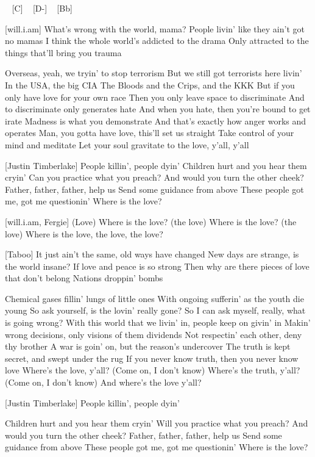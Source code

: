 \begin{guitar}
[F] ~ [C] ~ [D-] ~ [Bb]

[will.i.am]
What's wrong with the world, mama?
People livin' like they ain't got no mamas
I think the whole world's addicted to the drama
Only attracted to the things that'll bring you trauma

Overseas, yeah, we tryin' to stop terrorism
But we still got terrorists here livin'
In the USA, the big CIA
The Bloods and the Crips, and the KKK
But if you only have love for your own race
Then you only leave space to discriminate
And to discriminate only generates hate
And when you hate, then you're bound to get irate
Madness is what you demonstrate
And that's exactly how anger works and operates
Man, you gotta have love, this'll set us straight
Take control of your mind and meditate
Let your soul gravitate to the love, y'all, y'all

[Justin Timberlake]
People killin', people dyin'
Children hurt and you hear them cryin'
Can you practice what you preach?
And would you turn the other cheek?
Father, father, father, help us
Send some guidance from above
These people got me, got me questionin'
Where is the love?

[will.i.am, Fergie]
(Love) Where is the love? (the love)
Where is the love? (the love)
Where is the love, the love, the love?

[Taboo]
It just ain't the same, old ways have changed
New days are strange, is the world insane?
If love and peace is so strong
Then why are there pieces of love that don't belong
Nations droppin' bombs

Chemical gases fillin' lungs of little ones
With ongoing sufferin' as the youth die young
So ask yourself, is the lovin' really gone?
So I can ask myself, really, what is going wrong?
With this world that we livin' in, people keep on givin' in
Makin' wrong decisions, only visions of them dividends
Not respectin' each other, deny thy brother
A war is goin' on, but the reason's undercover
The truth is kept secret, and swept under the rug
If you never know truth, then you never know love
Where's the love, y'all? (Come on, I don't know)
Where's the truth, y'all? (Come on, I don't know)
And where's the love y'all?

[Justin Timberlake]
People killin', people dyin'

Children hurt and you hear them cryin'
Will you practice what you preach?
And would you turn the other cheek?
Father, father, father, help us
Send some guidance from above
These people got me, got me questionin'
Where is the love?


\end{guitar}
